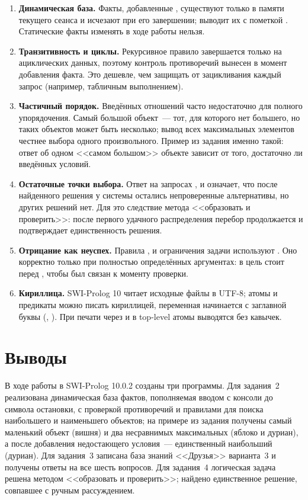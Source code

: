 \documentclass[14pt,a4paper]{extarticle}
\begin{document}
\begin{enumerate}
\item \textbf{Динамическая база.} Факты, добавленные , существуют только в памяти текущего сеанса и исчезают при его завершении;  выводит их с пометкой . Статические факты  изменять в ходе работы нельзя.
\item \textbf{Транзитивность и циклы.} Рекурсивное правило  завершается только на ациклических данных, поэтому контроль противоречий вынесен в момент добавления факта. Это дешевле, чем защищать от зацикливания каждый запрос (например, табличным выполнением).
\item \textbf{Частичный порядок.} Введённых отношений часто недостаточно для полного упорядочения. Самый большой объект~--- тот, для которого нет большего, но таких объектов может быть несколько; вывод всех максимальных элементов честнее выбора одного произвольного. Пример из задания именно такой: ответ об одном <<самом большом>> объекте зависит от того, достаточно ли введённых условий.
\item \textbf{Остаточные точки выбора.} Ответ   на запросах ,  и  означает, что после найденного решения у системы остались непроверенные альтернативы, но других решений нет. Для  это следствие метода <<образовать и проверить>>: после первого удачного распределения перебор продолжается и подтверждает единственность решения.
\item \textbf{Отрицание как неуспех.} Правила ,  и ограничения задачи используют \code{\textbackslash+}. Оно корректно только при полностью определённых аргументах: в  цель  стоит перед \code{\textbackslash+}, чтобы  был связан к моменту проверки.
\item \textbf{Кириллица.} SWI-Prolog 10 читает исходные файлы в UTF-8; атомы и предикаты можно писать кириллицей, переменная начинается с заглавной буквы (, ). При печати через  и в top-level атомы выводятся без кавычек.
\end{enumerate}

\section{Выводы}

В ходе работы в SWI-Prolog 10.0.2 созданы три программы. Для задания~2 реализована динамическая база фактов, пополняемая вводом с консоли до символа остановки, с проверкой противоречий и правилами для поиска наибольшего и наименьшего объектов; на примере из задания получены самый маленький объект (вишня) и два несравнимых максимальных (яблоко и дуриан), а после добавления недостающего условия~--- единственный наибольший (дуриан). Для задания~3 записана база знаний <<Друзья>> варианта~3 и получены ответы на все шесть вопросов. Для задания~4 логическая задача решена методом <<образовать и проверить>>; найдено единственное решение, совпавшее с ручным рассуждением.
\end{document}
